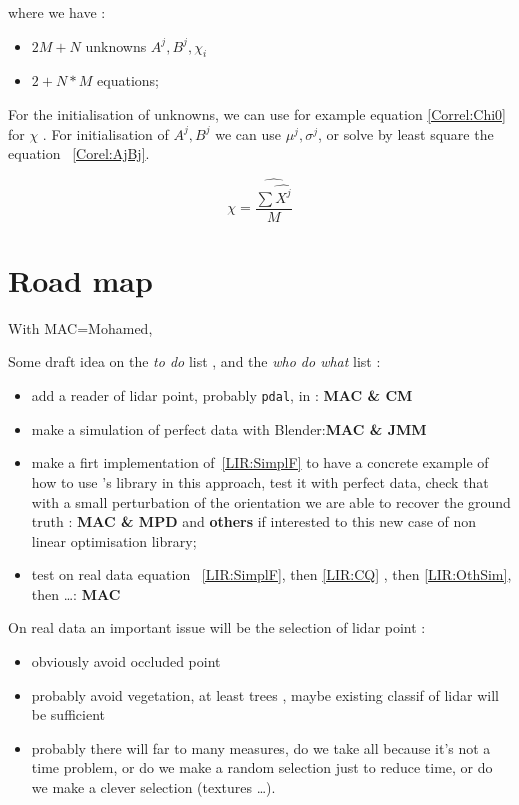 where we have :

\begin{itemize}
    \item $2 M + N$ unknowns  $A^j,B^j,\chi _i$
    \item $2 + N*M$ equations;
\end{itemize}


For the initialisation of unknowns, we can use for example equation  \ref{Correl:Chi0} for  $\chi$ .
For initialisation of $A^j, B^j$ we can use $\mu^j,\sigma^j$, or solve by least square the
equation ~\ref{Corel:AjBj}.

\begin{equation}
	\chi = \widehat {\frac{\sum \widehat {X^j} }{M}} \label{Correl:Chi0}
\end{equation}



\section{Road map}

With MAC=Mohamed,

Some draft idea on the \emph{to do} list , and the  \emph{who do what} list :

\begin{itemize}
    \item  add a reader of lidar point, probably {\tt pdal}, in \PPP  :  {\bf MAC \& CM}

    \item  make a simulation of perfect data with Blender:{\bf MAC \& JMM}

    \item make a firt implementation of~\ref{LIR:SimplF} to have a concrete example of 
         how to use  \PPP's library in this approach, test it with perfect data, check that  with
         a small perturbation of the orientation we are able to recover the ground truth :
         {\bf  MAC \& MPD} and {\bf  others} if interested to this new case of non linear optimisation library;

    \item test on real data equation ~\ref{LIR:SimplF}, then \ref{LIR:CQ} , then \ref{LIR:OthSim}, then \dots  : {\bf MAC} 
\end{itemize}

On real data an important issue will be  the selection of lidar point  : 

\begin{itemize}
     \item  obviously  avoid occluded point
     \item  probably   avoid vegetation, at least trees , maybe existing classif of lidar will be sufficient
     \item  probably there will far to many measures,  do we take all because it's not a time problem, 
            or do we make a random selection just to reduce time, or do we make a clever selection (textures \dots).
\end{itemize}






